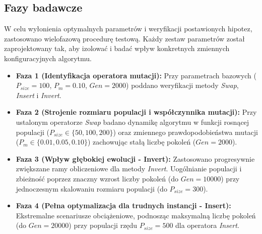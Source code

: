 \documentclass[conference]{IEEEtran}
\begin{document}
        \subsection{Fazy badawcze}
            W celu wyłonienia optymalnych parametrów i weryfikacji postawionych hipotez, zastosowano wielofazową procedurę testową. Każdy zestaw parametrów został zaprojektowany tak, aby izolować i badać wpływ konkretnych zmiennych konfiguracyjnych algorytmu.
            \begin{itemize}
                \item \textbf{Faza 1 (Identyfikacja operatora mutacji):} Przy parametrach bazowych ($P_{size}=100$, $P_m=0.10$, $Gen=2000$) poddano weryfikacji metody \textit{Swap}, \textit{Insert} i \textit{Invert}.
                \item \textbf{Faza 2 (Strojenie rozmiaru populacji i współczynnika mutacji):} Przy ustalonym operatorze \textit{Swap} badano dynamikę algorytmu w funkcji rosnącej populacji ($P_{size} \in \{50, 100, 200\}$) oraz zmiennego prawdopodobieństwa mutacji ($P_m \in \{0.01, 0.05, 0.10\}$) zachowując stałą liczbę pokoleń ($Gen=2000$).
                \item \textbf{Faza 3 (Wpływ głębokiej ewolucji - Invert):} Zastosowano progresywnie zwiększane ramy obliczeniowe dla metody \textit{Invert}. Uogólnianie populacji i zbieżność poprzez znaczny wzrost liczby pokoleń (do $Gen=10000$) przy jednoczesnym skalowaniu rozmiaru populacji (do $P_{size}=300$).
                \item \textbf{Faza 4 (Pełna optymalizacja dla trudnych instancji - Insert):} Ekstremalne scenariusze obciążeniowe, podnosząc maksymalną liczbę pokoleń (do $Gen=20000$) przy populacji rzędu $P_{size}=500$ dla operatora \textit{Insert}.
            \end{itemize}
            
\end{document}
